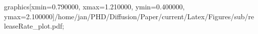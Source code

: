 graphics[xmin=0.790000, xmax=1.210000, ymin=0.400000, ymax=2.100000]{/home/jan/PHD/Diffusion/Paper/current/Latex/Figures/sub/releaseRate_plot.pdf}; 
